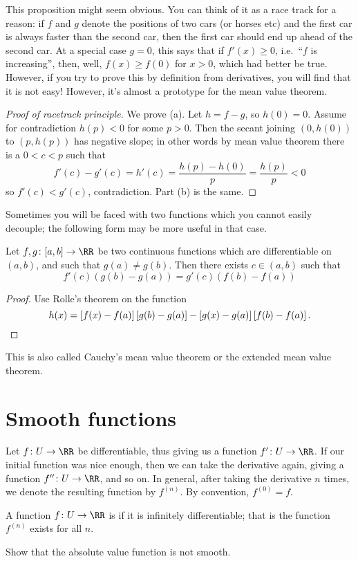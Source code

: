 This proposition might seem obvious.
You can think of it as a race track for a reason:
if $f$ and $g$ denote the positions of two cars (or horses etc)
and the first car is always faster than the second car,
then the first car should end up ahead of the second car.
At a special case $g = 0$, this says that if $f'(x) \ge 0$,
i.e.\ ``$f$ is increasing'',
then, well, $f(x) \ge f(0)$ for $x > 0$, which had better be true.
However, if you try to prove this by definition from derivatives,
you will find that it is not easy!
However, it's almost a prototype for the mean value theorem.

\begin{proof}
	[Proof of racetrack principle]
	We prove (a). Let $h = f-g$, so $h(0) = 0$.
	Assume for contradiction $h(p) < 0$ for some $p > 0$.
	Then the secant joining $(0, h(0))$ to $(p, h(p))$ has negative slope;
	in other words by mean value theorem there is a $0 < c < p$
	such that
	\[ f'(c) - g'(c) = h'(c) = \frac{h(p)-h(0)}{p} = \frac{h(p)}{p} < 0 \]
	so $f'(c) < g'(c)$, contradiction.
	Part (b) is the same.
\end{proof}

Sometimes you will be faced with two functions which you cannot
easily decouple; the following form may be more useful in that case.
\begin{theorem}
	Let $f, g \colon [a,b] \to \RR$ be two continuous functions
	which are differentiable on $(a,b)$,
	and such that $g(a) \neq g(b)$.
	Then there exists $c \in (a,b)$ such that
	\[ f'(c)(g(b)-g(a)) = g'(c)(f(b)-f(a)) \]
\end{theorem}
\begin{proof}
	Use Rolle's theorem on the function
	\[ h(x) = \left[ f(x)-f(a) \right] \left[ g(b)-g(a) \right]
		- \left[ g(x)-g(a) \right] \left[ f(b)-f(a) \right].  \qedhere \]
\end{proof}
This is also called Cauchy's mean value theorem
or the extended mean value theorem.

\section{Smooth functions}

Let $f \colon U \to \RR$ be differentiable,
thus giving us a function $f' \colon U \to \RR$.
If our initial function was nice enough,
then we can take the derivative again,
giving a function $f'' \colon U \to \RR$, and so on.
In general, after taking the derivative $n$ times,
we denote the resulting function by $f^{(n)}$.
By convention, $f^{(0)} = f$.
\begin{definition}
	A function $f \colon U \to \RR$ is 
	if it is infinitely differentiable;
	that is the function $f^{(n)}$ exists for all $n$.
\end{definition}
\begin{ques}
	Show that the absolute value function is not smooth.
\end{ques}

